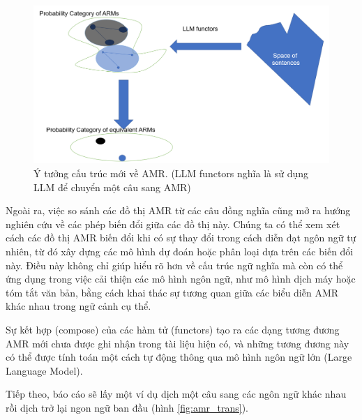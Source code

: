 \begin{figure}[H]
    \centering
    \includegraphics[width=1\linewidth]{Images/GDL/new_AMR_structure.png}
    \caption{Ý tưởng cấu trúc mới về AMR. (LLM functors nghĩa là sử dụng LLM để chuyển một câu sang AMR)}
\end{figure}

Ngoài ra, việc so sánh các đồ thị AMR từ các câu đồng nghĩa cũng mở ra hướng nghiên cứu về các phép biến đổi giữa các đồ thị này. Chúng ta có thể xem xét cách các đồ thị AMR biến đổi khi có sự thay đổi trong cách diễn đạt ngôn ngữ tự nhiên, từ đó xây dựng các mô hình dự đoán hoặc phân loại dựa trên các biến đổi này. Điều này không chỉ giúp hiểu rõ hơn về cấu trúc ngữ nghĩa mà còn có thể ứng dụng trong việc cải thiện các mô hình ngôn ngữ, như mô hình dịch máy hoặc tóm tắt văn bản, bằng cách khai thác sự tương quan giữa các biểu diễn AMR khác nhau trong ngữ cảnh cụ thể.

Sự kết hợp (compose) của các hàm tử (functors) tạo ra các dạng tương đương AMR mới chưa được ghi nhận trong tài liệu hiện có, và những tương đương này có thể được tính toán một cách tự động thông qua mô hình ngôn ngữ lớn (Large Language Model).

Tiếp theo, báo cáo sẽ lấy một ví dụ dịch một câu sang các ngôn ngữ khác nhau rồi dịch trở lại ngon ngữ ban đầu (hình \ref{fig:amr_trans}).

